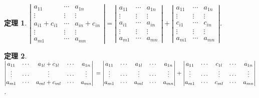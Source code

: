 \documentclass[12pt]{article}
\newtheorem*{theorem}{定理}
\begin{document}
    \begin{theorem}
        $\left|\begin{matrix}
            a_{11}&\cdots&a_{1n}\\\vdots&\vdots&\vdots\\a_{i1}+c_{i1}&\cdots&a_{in}+c_{in}\\\vdots&\vdots&\vdots\\a_{m1}&\cdots&a_{mn}
        \end{matrix}\right|=\left|\begin{matrix}
            a_{11}&\cdots&a_{1n}\\\vdots&\vdots&\vdots\\a_{i1}&\cdots&a_{in}\\\vdots&\vdots&\vdots\\a_{m1}&\cdots&a_{mn}
        \end{matrix}\right|+\left|\begin{matrix}
            a_{11}&\cdots&a_{1n}\\\vdots&\vdots&\vdots\\c_{i1}&\cdots&c_{in}\\\vdots&\vdots&\vdots\\a_{m1}&\cdots&a_{mn}
        \end{matrix}\right|$.
    \end{theorem}

    \begin{theorem}
        $\left|\begin{matrix}
            a_{11}&\cdots&a_{1l}+c_{1l}&\cdots&a_{1n}\\\vdots&\cdots&\vdots&\cdots&\vdots\\a_{m1}&\cdots&a_{ml}+c_{ml}&\cdots&a_{mn}
        \end{matrix}\right|\\=\left|\begin{matrix}
            a_{11}&\cdots&a_{1l}&\cdots&a_{1n}\\\vdots&\cdots&\vdots&\cdots&\vdots\\a_{m1}&\cdots&a_{ml}&\cdots&a_{mn}
        \end{matrix}\right|+\left|\begin{matrix}
            a_{11}&\cdots&c_{1l}&\cdots&a_{1n}\\\vdots&\cdots&\vdots&\cdots&\vdots\\a_{m1}&\cdots&c_{ml}&\cdots&a_{mn}
        \end{matrix}\right|$.
    \end{theorem}
\end{document}
